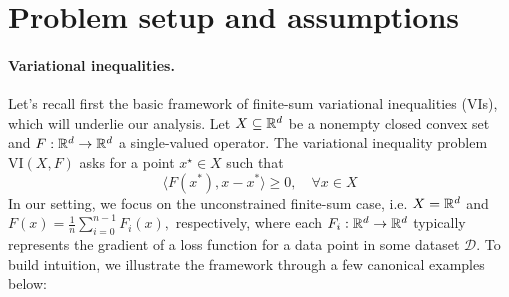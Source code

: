 \vspace{-0.5em}
\section{Problem setup and assumptions}
\paragraph{Variational inequalities.}  
Let's recall first the basic framework of finite-sum variational inequalities (VIs), which will underlie our analysis. 
Let $X \subseteq \mathbb{R}^d$ be a nonempty closed convex set and $F:\mathbb{R}^d \to \mathbb{R}^d$ a single-valued operator. 
The variational inequality problem $\mathrm{VI}(X,F)$ asks for a point $x^\star \in X$ such that
\begin{equation} \tag{VIP}
    \langle F(x^*), x - x^*\rangle \geq 0, \quad \forall x \in X \label{VIP}
\end{equation}
In our setting, we focus on the unconstrained finite-sum case, i.e. $X=\mathbb{R}^d$ and
\(
F(x) = \frac{1}{n} \sum_{i=0}^{n-1} F_i(x),
\)
respectively, where each $F_i:\mathbb{R}^d \to \mathbb{R}^d$ typically represents the gradient of a loss function for a data point in some dataset $\mathcal{D}$.
To build intuition, we illustrate the framework through a few canonical examples below:\\
%
%

